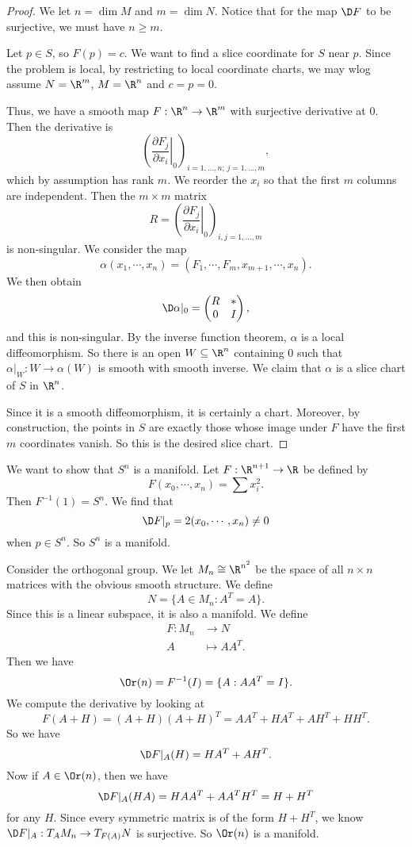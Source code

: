 \documentclass[a4paper]{article}
\begin{document}
\begin{proof}
  We let $n = \dim M$ and $m = \dim N$. Notice that for the map $\D F$ to be surjective, we must have $n \geq m$.

  Let $p \in S$, so $F(p) = c$. We want to find a slice coordinate for $S$ near $p$. Since the problem is local, by restricting to local coordinate charts, we may wlog assume $N = \R^m$, $M = \R^n$ and $c = p = 0$.

  Thus, we have a smooth map $F: \R^n \to \R^m$ with surjective derivative at $0$. Then the derivative is
  \[
    \left(\left.\frac{\partial F_j}{\partial x_i}\right|_0\right)_{i = 1, \ldots, n; \, j = 1, \ldots, m},
  \]
  which by assumption has rank $m$. We reorder the $x_i$ so that the first $m$ columns are independent. Then the $m \times m$ matrix
  \[
    R = \left(\left.\frac{\partial F_j}{\partial x_i}\right|_0\right)_{i,j = 1, \ldots, m}
  \]
  is non-singular. We consider the map
  \[
    \alpha(x_1, \cdots, x_n) = (F_1, \cdots, F_m, x_{m + 1}, \cdots, x_n).
  \]
  We then obtain
  \[
    \D \alpha|_0 =
    \begin{pmatrix}
      R & * \\
      0 & I
    \end{pmatrix},
  \]
  and this is non-singular. By the inverse function theorem, $\alpha$ is a local diffeomorphism. So there is an open $W\subseteq \R^n$ containing $0$ such that $\alpha|_W: W \to \alpha(W)$ is smooth with smooth inverse. We claim that $\alpha$ is a slice chart of $S$ in $\R^n$.

  Since it is a smooth diffeomorphism, it is certainly a chart. Moreover, by construction, the points in $S$ are exactly those whose image under $F$ have the first $m$ coordinates vanish. So this is the desired slice chart.
\end{proof}

\begin{eg}
  We want to show that $S^n$ is a manifold. Let $F: \R^{n + 1} \to \R$ be defined by
  \[
    F(x_0, \cdots, x_n) = \sum x_i^2.
  \]
  Then $F^{-1}(1) = S^n$. We find that
  \[
    \D F|_p = 2(x_0, \cdots, x_n) \not= 0
  \]
  when $p \in S^n$. So $S^n$ is a manifold.
\end{eg}

\begin{eg}
  Consider the orthogonal group. We let $M_n \cong \R^{n^2}$ be the space of all $n \times n$ matrices with the obvious smooth structure. We define
  \[
    N = \{A \in M_n: A^T = A\}.
  \]
  Since this is a linear subspace, it is also a manifold. We define
  \begin{align*}
    F: M_n &\to N\\
    A &\mapsto AA^T.
  \end{align*}
  Then we have
  \[
    \Or(n) = F^{-1}(I) = \{A: AA^T = I\}.
  \]
  We compute the derivative by looking at
  \[
    F (A + H) = (A + H)(A + H)^T = AA^T + HA^T + AH^T + HH^T.
  \]
  So we have
  \[
    \D F|_A (H) = HA^T + AH^T.
  \]
  Now if $A \in \Or(n)$, then we have
  \[
    \D F|_A (HA) = HAA^T + AA^T H^T = H + H^T
  \]
  for any $H$. Since every symmetric matrix is of the form $H + H^T$, we know $\D F|_A: T_A M_n \to T_{F(A)}N$ is surjective. So $\Or(n)$ is a manifold.
\end{eg}
\end{document}
